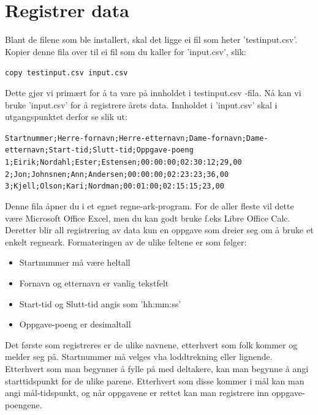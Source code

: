 \documentclass[12pt]{book}
\begin{document}
\newpage

\section{Registrer data}

Blant de filene som ble installert, skal det ligge ei fil som heter 'testinput.csv'.  Kopier denne fila over til ei fil som du kaller for 'input.csv', slik:

\begin{alltt}
\texttt{copy testinput.csv input.csv  {\Return} }
\end{alltt}

Dette gjør vi primært for å ta vare på innholdet i testinput.csv -fila. Nå kan vi bruke 'input.csv' for å registrere årets data. Innholdet i 'input.csv' skal i utgangspunktet derfor se slik ut:

\scriptsize
\begin{alltt}
Startnummer;Herre-fornavn;Herre-etternavn;Dame-fornavn;Dame-etternavn;Start-tid;Slutt-tid;Oppgave-poeng
1;Eirik;Nordahl;Ester;Estensen;00:00:00;02:30:12;29,00
2;Jon;Johnsnen;Ann;Andersen;00:00:00;02:23:23;36,00
3;Kjell;Olson;Kari;Nordman;00:01:00;02:15:15;23,00
\end{alltt}

\normalsize

Denne fila åpner du i et egnet regne-ark-program. For de aller fleste vil dette være Microsoft Office Excel, men du kan godt bruke f.eks Libre Office Calc. Deretter blir all registrering av data kun en oppgave som dreier seg om å bruke et enkelt regneark. Formateringen av de ulike feltene er som følger:

\begin{itemize}
  \item Startnummer må være heltall
  \item Fornavn og etternavn er vanlig tekstfelt
  \item Start-tid og Slutt-tid angis som 'hh:mm:ss'
  \item Oppgave-poeng er desimaltall
\end{itemize}

Det første som registreres er de ulike navnene, etterhvert som folk kommer og melder seg på. Startnummer må velges vha loddtrekning eller lignende. Etterhvert som man begynner å fylle på med deltakere, kan man begynne å angi starttidspunkt for de ulike parene. Etterhvert som disse kommer i mål kan man angi mål-tidspunkt, og når oppgavene er rettet kan man registrere inn oppgave-poengene.
\end{document}
